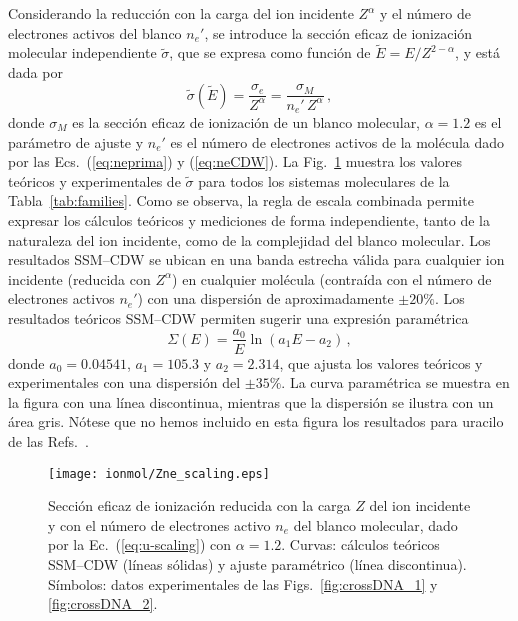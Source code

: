 Considerando la reducción con la carga del ion incidente $Z^\alpha$ y  
el número de electrones activos del blanco $n_e'$, se introduce la 
sección eficaz de ionización molecular independiente $\tilde{\sigma}$, 
que se expresa como función de $\tilde{E}=E/Z^{2-\alpha}$, y está dada 
por 
\begin{equation}
\tilde{\sigma}\left(\tilde{E}\right)=\frac{\sigma_e}{Z^{\alpha}}
=\frac{\sigma_M}{n_e'\,Z^{\alpha}}\,,
\label{eq:u-scaling}
\end{equation}
donde $\sigma_M$ es la sección eficaz de ionización de un blanco 
molecular, $\alpha=1.2$ es el parámetro de ajuste y $n_e'$ es el número 
de electrones activos de la molécula dado por las 
Ecs.~(\ref{eq:neprima}) y (\ref{eq:neCDW}). La Fig.~\ref{fig:zalpha} 
muestra los valores teóricos y experimentales de $\tilde{\sigma}$ para 
todos los sistemas moleculares de la Tabla~\ref{tab:families}. Como se 
observa, la regla de escala combinada permite expresar los cálculos 
teóricos y mediciones de forma independiente, tanto de la naturaleza del 
ion incidente, como de la complejidad del blanco molecular. Los 
resultados SSM--CDW se ubican en una banda estrecha válida para 
cualquier ion incidente (reducida con $Z^\alpha$) en cualquier 
molécula (contraída con el número de electrones activos $n_e'$) con una 
dispersión de aproximadamente $\pm 20\%$. Los resultados teóricos 
SSM--CDW permiten sugerir una expresión paramétrica
\begin{equation}
\Sigma(E)= \frac{a_0}{E} \ln \left( a_1 E - a_2 \right)\,,
\end{equation}
donde $a_0=0.04541$, $a_1=105.3$ y $a_2=2.314$, que ajusta los valores 
teóricos y experimentales con una dispersión del $\pm 35\%$. La curva 
paramétrica se muestra en la figura con una línea discontinua, mientras 
que la dispersión se ilustra con un área gris. Nótese que no hemos 
incluido en esta figura los resultados para uracilo de las 
Refs.~\cite{agnihotri2012,agnihotri2013}. 

\begin{figure}[t]
\centering
\texttt{[image: ionmol/Zne\_scaling.eps]}
\caption[Sección eficaz de ionización reducida por $Z$ y $n_e$.]
{Sección eficaz de ionización reducida con la carga $Z$ del ion 
incidente y con el número de electrones activo $n_e$ del blanco 
molecular, dado por la Ec.~(\ref{eq:u-scaling}) con $\alpha=1.2$. 
Curvas: cálculos teóricos SSM--CDW (líneas sólidas) y ajuste paramétrico 
(línea discontinua). Símbolos: datos experimentales de las 
Figs.~\ref{fig:crossDNA_1} y \ref{fig:crossDNA_2}.}
\label{fig:zalpha}
\end{figure} 

